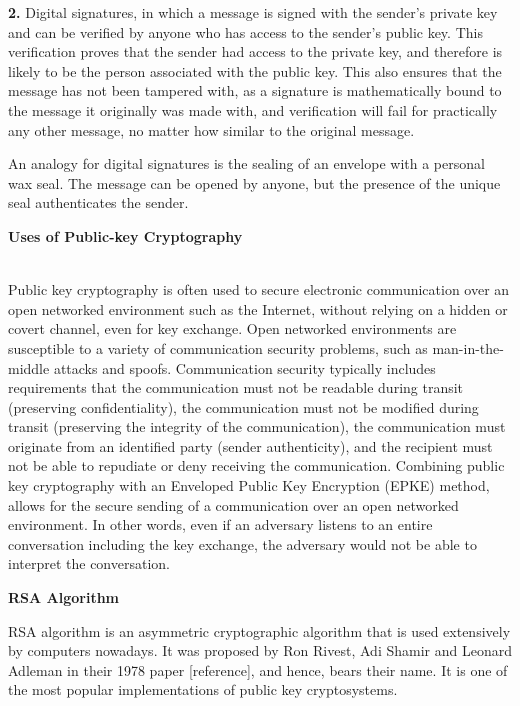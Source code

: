 \documentclass[12 pt]{article}
\begin{document}
\textbf{2. }Digital signatures, in which a message is signed with the sender's private key and can be verified by anyone who has access to the sender's public key. This verification proves that the sender had access to the private key, and therefore is likely to be the person associated with the public key. This also ensures that the message has not been tampered with, as a signature is mathematically bound to the message it originally was made with, and verification will fail for practically any other message, no matter how similar to the original message.

An analogy for digital signatures is the sealing of an envelope with a personal wax seal. The message can be opened by anyone, but the presence of the unique seal authenticates the sender.

\pagebreak

\begin{Large}
\noindent \textbf{{Uses of Public-key Cryptography}}
\end{Large}
\\Public key cryptography is often used to secure electronic communication over an open networked environment such as the Internet, without relying on a hidden or covert channel, even for key exchange. Open networked environments are susceptible to a variety of communication security problems, such as man-in-the-middle attacks and spoofs. Communication security typically includes requirements that the communication must not be readable during transit (preserving confidentiality), the communication must not be modified during transit (preserving the integrity of the communication), the communication must originate from an identified party (sender authenticity), and the recipient must not be able to repudiate or deny receiving the communication. Combining public key cryptography with an Enveloped Public Key Encryption (EPKE) method, allows for the secure sending of a communication over an open networked environment. In other words, even if an adversary listens to an entire conversation including the key exchange, the adversary would not be able to interpret the conversation.

\pagebreak

\begin{LARGE}
\begin{center}
  \textbf{{RSA Algorithm}}
\end{center}
\end{LARGE}\bigskip

\noindent RSA algorithm is an asymmetric cryptographic algorithm that is used extensively by computers nowadays. It was proposed by Ron Rivest, Adi Shamir and Leonard Adleman in their 1978 paper [reference], and hence, bears their name. It is one of the most popular implementations of public key cryptosystems.\bigskip
\end{document}
